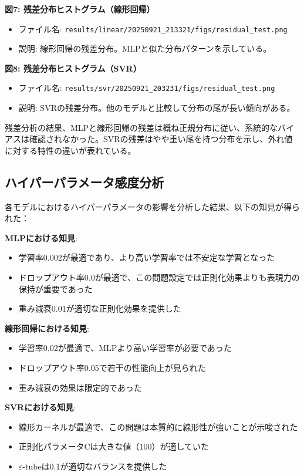 \documentclass[12pt,a4paper,dvipdfmx]{jsarticle}
\begin{document}
\textbf{図7: 残差分布ヒストグラム（線形回帰）}
\begin{itemize}
    \item ファイル名: \texttt{results/linear/20250921\_213321/figs/residual\_test.png}
    \item 説明: 線形回帰の残差分布。MLPと似た分布パターンを示している。
\end{itemize}

\textbf{図8: 残差分布ヒストグラム（SVR）}
\begin{itemize}
    \item ファイル名: \texttt{results/svr/20250921\_203231/figs/residual\_test.png}
    \item 説明: SVRの残差分布。他のモデルと比較して分布の尾が長い傾向がある。
\end{itemize}

残差分析の結果、MLPと線形回帰の残差は概ね正規分布に従い、系統的なバイアスは確認されなかった。SVRの残差はやや重い尾を持つ分布を示し、外れ値に対する特性の違いが表れている。

\subsection{ハイパーパラメータ感度分析}

各モデルにおけるハイパーパラメータの影響を分析した結果、以下の知見が得られた：

\textbf{MLPにおける知見}:
\begin{itemize}
    \item 学習率0.002が最適であり、より高い学習率では不安定な学習となった
    \item ドロップアウト率0.0が最適で、この問題設定では正則化効果よりも表現力の保持が重要であった
    \item 重み減衰0.01が適切な正則化効果を提供した
\end{itemize}

\textbf{線形回帰における知見}:
\begin{itemize}
    \item 学習率0.02が最適で、MLPより高い学習率が必要であった
    \item ドロップアウト率0.05で若干の性能向上が見られた
    \item 重み減衰の効果は限定的であった
\end{itemize}

\textbf{SVRにおける知見}:
\begin{itemize}
    \item 線形カーネルが最適で、この問題は本質的に線形性が強いことが示唆された
    \item 正則化パラメータCは大きな値（100）が適していた
    \item $\varepsilon$-tubeは0.1が適切なバランスを提供した
\end{itemize}
\end{document}
